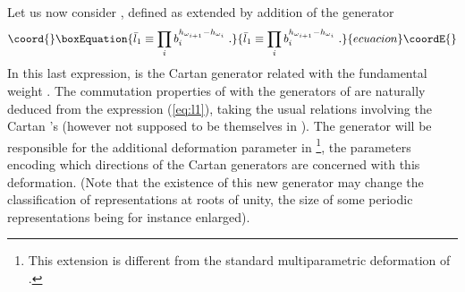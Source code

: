\documentclass[a4paper,a4paper]{article}
\begin{document}
Let us now consider \coordHE{}, defined  as
\coordHE{} extended by addition of the generator 
\begin{equation}\coord{}\boxEquation{
  \label{eq:l1}
  \bar l_1 \equiv \prod_i b_i^{h_{\omega_{i+1}}-h_{\omega_{i}}} \;.
}{
  \bar l_1 \equiv \prod_i b_i^{h_{\omega_{i+1}}-h_{\omega_{i}}} \;.
}{ecuacion}\coordE{}\end{equation}
In this last expression, 
\coordHE{} is the Cartan generator related with the
fundamental weight \coordHE{}. 
The commutation properties of \coordHE{} with the generators of
\coordHE{} are naturally deduced from the
expression (\ref{eq:l1}), taking the usual relations involving the
Cartan \coordHE{}'s (however not supposed to be themselves in \coordHE{}). 
The generator
\coordHE{} will be  responsible for the additional
deformation parameter \coordHE{} in \coordHE{}\footnote{This
  extension is different from the standard multiparametric deformation
  of \coordHE{}.}, the parameters
\coordHE{} encoding  which directions of the Cartan generators are
concerned with this deformation. (Note that the existence of this new
generator may change the classification of representations at roots of
unity, the size of some periodic representations being for instance
enlarged). 

\medskip
\end{document}
